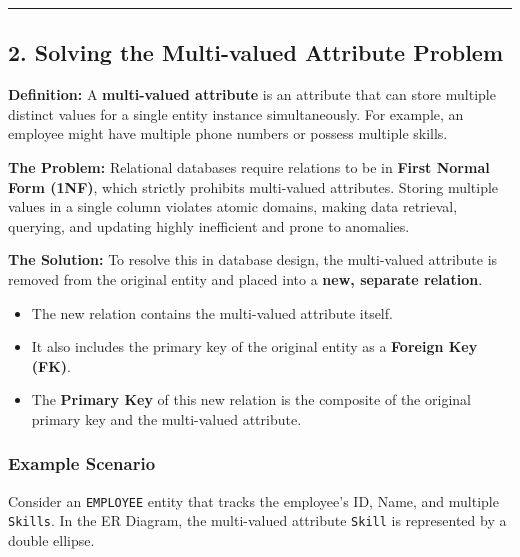 \documentclass[12pt,a3paper]{article}
\begin{document}
\begin{enumerate}
\begin{tcolorbox}[enhanced,breakable,ansbox,colback=cA!4,colframe=cA,boxrule=0.8pt,arc=5pt,title={\textbf{Answer}},fonttitle=\bfseries\color{white},colbacktitle=cA]
\vspace{1em}
\hrule
\vspace{1em}

\subsection*{2. Solving the Multi-valued Attribute Problem}

\textbf{Definition:} A \textbf{multi-valued attribute} is an attribute that can store multiple distinct values for a single entity instance simultaneously. For example, an employee might have multiple phone numbers or possess multiple skills. 

\textbf{The Problem:} Relational databases require relations to be in \textbf{First Normal Form (1NF)}, which strictly prohibits multi-valued attributes. Storing multiple values in a single column violates atomic domains, making data retrieval, querying, and updating highly inefficient and prone to anomalies.

\textbf{The Solution:} To resolve this in database design, the multi-valued attribute is removed from the original entity and placed into a \textbf{new, separate relation}. 
\begin{itemize}
    \item The new relation contains the multi-valued attribute itself.
    \item It also includes the primary key of the original entity as a \textbf{Foreign Key (FK)}.
    \item The \textbf{Primary Key} of this new relation is the composite of the original primary key and the multi-valued attribute.
\end{itemize}

\subsubsection*{Example Scenario}
Consider an \texttt{EMPLOYEE} entity that tracks the employee's ID, Name, and multiple \texttt{Skills}. In the ER Diagram, the multi-valued attribute \texttt{Skill} is represented by a double ellipse.

\vspace{1em}
\begin{center}
\end{center}
\end{tcolorbox}
\end{enumerate}
\end{document}
